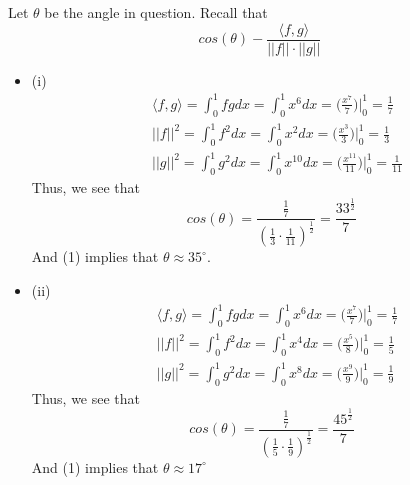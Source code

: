 \documentclass[12pt]{article}
\newenvironment{problem}[2][Problem]{\begin{trivlist}
\item[\hskip \labelsep {\bfseries #1}\hskip \labelsep {\bfseries #2.}]}{\end{trivlist}}
\theoremstyle{definition}
\theoremstyle{definition}
\theoremstyle{definition}
\theoremstyle{definition}
\begin{document}
\begin{problem}{3.3}
Let $\theta$ be the angle in question. Recall that $$ cos(\theta) - \frac{\langle f, g \rangle}{||f|| \cdot ||g||} $$
\begin{itemize}
\item (i)
\begin{align*}
&\langle f,g \rangle = \int_0^1 fg dx = \int_0^1 x^6 dx = \bigg(\frac{x^7}{7} \bigg) \bigg\vert_0^1 = \frac{1}{7} \\
&||f||^2 = \int_0^1 f^2 dx = \int_0^1 x^2 dx = \bigg(\frac{x^3}{3} \bigg) \bigg\vert_0^1 = \frac{1}{3} \\
&||g||^2 = \int_0^1 g^2 dx = \int_0^1 x^10 dx = \bigg(\frac{x^{11}}{11}\bigg) \bigg\vert_0^1 = \frac{1}{11}
\end{align*}
Thus, we see that 
\begin{equation}
cos(\theta) = \frac{\frac{1}{7}}{(\frac{1}{3} \cdot \frac{1}{11}) ^\frac{1}{2}} = \frac{33^{\frac{1}{2}}}{7}
\end{equation}
And (1) implies that $\theta \approx 35^{\circ}$. 
\item (ii)
\begin{align*}
&\langle f,g \rangle = \int_0^1 fg dx = \int_0^1 x^6 dx = \bigg(\frac{x^7}{7} \bigg) \bigg\vert_0^1 = \frac{1}{7} \\
&||f||^2 = \int_0^1 f^2 dx = \int_0^1 x^4 dx = \bigg(\frac{x^5}{8} \bigg) \bigg\vert_0^1 = \frac{1}{5} \\
&||g||^2 = \int_0^1 g^2 dx = \int_0^1 x^8 dx = \bigg(\frac{x^{9}}{9}\bigg) \bigg\vert_0^1 = \frac{1}{9}
\end{align*}
Thus, we see that 
\begin{equation}
cos(\theta) = \frac{\frac{1}{7}}{(\frac{1}{5} \cdot \frac{1}{9}) ^\frac{1}{2}} = \frac{45^{\frac{1}{2}}}{7}
\end{equation}
And (1) implies that $\theta \approx 17^{\circ}$
\end{itemize}
\end{problem}
\end{document}
